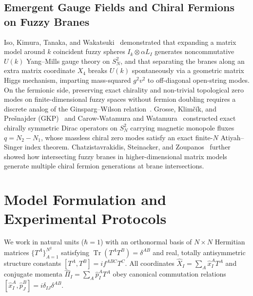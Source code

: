 \documentclass[11pt,a4paper]{article}
\DeclareMathOperator{\Tr}{Tr}
\begin{document}
\subsection{Emergent Gauge Fields and Chiral Fermions on Fuzzy Branes}
Iso, Kimura, Tanaka, and Wakatsuki~\cite{Iso2001} demonstrated that expanding a matrix model around $k$ coincident fuzzy spheres $I_k \otimes \alpha L_I$ generates noncommutative $U(k)$ Yang--Mills gauge theory on $S^2_N$, and that separating the branes along an extra matrix coordinate $X_4$ breaks $U(k)$ spontaneously via a geometric matrix Higgs mechanism, imparting mass-squared $g^2 v^2$ to off-diagonal open-string modes. On the fermionic side, preserving exact chirality and non-trivial topological zero modes on finite-dimensional fuzzy spaces without fermion doubling requires a discrete analog of the Ginsparg--Wilson relation~\cite{Ginsparg1982}. Grosse, Klim\v{c}\'ik, and Pre\v{s}najder (GKP)~\cite{Grosse1996} and Carow-Watamura and Watamura~\cite{CarowWatamura1997} constructed exact chirally symmetric Dirac operators on $S^2_N$ carrying magnetic monopole fluxes $q = N_2 - N_1$, whose massless chiral zero modes satisfy an exact finite-$N$ Atiyah--Singer index theorem. Chatzistavrakidis, Steinacker, and Zoupanos~\cite{Chatzistavrakidis2011} further showed how intersecting fuzzy branes in higher-dimensional matrix models generate multiple chiral fermion generations at brane intersections.

\section{Model Formulation and Experimental Protocols}
\label{sec:model}

We work in natural units ($\hbar = 1$) with an orthonormal basis of $N\times N$ Hermitian matrices $\{T^A\}_{A=1}^{N^2}$ satisfying $\Tr(T^A T^B) = \delta^{AB}$ and real, totally antisymmetric structure constants $[T^A, T^B] = i f^{ABC} T^C$. All coordinates $\hat{X}_I = \sum_A \hat{x}_I^A T^A$ and conjugate momenta $\hat{\Pi}_I = \sum_A \hat{p}_I^A T^A$ obey canonical commutation relations $[\hat{x}_I^A, \hat{p}_J^B] = i \delta_{IJ}\delta^{AB}$.
\end{document}
